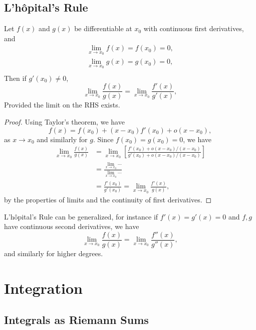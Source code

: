 \documentclass[12pt]{article}
\begin{document}
\subsection{L'h\^{o}pital's Rule}

\begin{theorem}
    Let $f(x)$ and $g(x)$ be differentiable at $x_{0}$ with
    continuous first derivatives, and
    \begin{align*}
    \lim\limits_{x\to x_{0}}f(x) = f(x_{0}) = 0,\\
    \lim\limits_{x\to x_{0}}g(x) = g(x_{0}) = 0,\\
    \end{align*}
    Then if $g'(x_{0}) \ne 0$, 
    \[
    \lim\limits_{x\to x_{0}} \frac{f(x)}{g(x)} = 
    \lim\limits_{x\to x_{0}} \frac{f'(x)}{g'(x)},
    \]
    Provided the limit on the RHS exists.
\end{theorem}

\begin{proof}
    Using Taylor's theorem, we have
    \[
    f(x) = f(x_{0}) + (x - x_{0})f'(x_{0}) + o(x - x_{0}),
    \]
    as $x \to x_{0}$ and similarly for $g$. Since $f(x_{0}) = g(x_{0}) = 0$, we have
    \begin{align*}
        \lim\limits_{x\to x_{0}}\frac{f(x)}{g(x)} 
        &= \lim\limits_{x \to x_{0}}
        \left[\frac{f'(x_{0}) + o(x-x_{0})/(x - x_{0})}{g'(x_{0}) + o(x-x_{0})/(x - x_{0})}\right]\\
        &= \frac{\lim\limits_{x\to x_{0}} \cdots}{\lim\limits_{x\to x_{0}} \cdots}\\
        &= \frac{f'(x_{0})}{g'(x_{0})}
        = \lim\limits_{x\to x_{0}} \frac{f'(x)}{g(x)},
    \end{align*}
    by the properties of limits and the continuity of first derivatives.
\end{proof}

L'h\^{o}pital's Rule can be generalized,
for instance if $f'(x) = g'(x) = 0$ and 
$f,g$ have continuous second derivatives,
we have
\[
\lim\limits_{x\to x_{0}}\frac{f(x)}{g(x)} = \lim\limits_{x\to x_{0}}\frac{f''(x)}{g''(x)},
\]
and similarly for higher degrees.


\section{Integration}

\subsection{Integrals as Riemann Sums}
\end{document}
